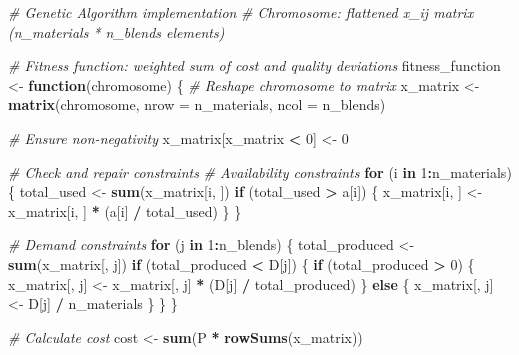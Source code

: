 \documentclass[
]{article}
\newenvironment{Shaded}{\begin{snugshade}}{\end{snugshade}}
\newcommand{\AttributeTok}[1]{\textcolor[rgb]{0.13,0.29,0.53}{#1}}
\newcommand{\CommentTok}[1]{\textcolor[rgb]{0.56,0.35,0.01}{\textit{#1}}}
\newcommand{\ControlFlowTok}[1]{\textcolor[rgb]{0.13,0.29,0.53}{\textbf{#1}}}
\newcommand{\DecValTok}[1]{\textcolor[rgb]{0.00,0.00,0.81}{#1}}
\newcommand{\FunctionTok}[1]{\textcolor[rgb]{0.13,0.29,0.53}{\textbf{#1}}}
\newcommand{\NormalTok}[1]{#1}
\newcommand{\OtherTok}[1]{\textcolor[rgb]{0.56,0.35,0.01}{#1}}
\newcommand{\SpecialCharTok}[1]{\textcolor[rgb]{0.81,0.36,0.00}{\textbf{#1}}}
\begin{document}
\begin{Shaded}
\begin{Highlighting}[]
\CommentTok{\# Genetic Algorithm implementation}
\CommentTok{\# Chromosome: flattened x\_ij matrix (n\_materials * n\_blends elements)}

\CommentTok{\# Fitness function: weighted sum of cost and quality deviations}
\NormalTok{fitness\_function }\OtherTok{\textless{}{-}} \ControlFlowTok{function}\NormalTok{(chromosome) \{}
  \CommentTok{\# Reshape chromosome to matrix}
\NormalTok{  x\_matrix }\OtherTok{\textless{}{-}} \FunctionTok{matrix}\NormalTok{(chromosome, }\AttributeTok{nrow =}\NormalTok{ n\_materials, }\AttributeTok{ncol =}\NormalTok{ n\_blends)}
  
  \CommentTok{\# Ensure non{-}negativity}
\NormalTok{  x\_matrix[x\_matrix }\SpecialCharTok{\textless{}} \DecValTok{0}\NormalTok{] }\OtherTok{\textless{}{-}} \DecValTok{0}
  
  \CommentTok{\# Check and repair constraints}
  \CommentTok{\# Availability constraints}
  \ControlFlowTok{for}\NormalTok{ (i }\ControlFlowTok{in} \DecValTok{1}\SpecialCharTok{:}\NormalTok{n\_materials) \{}
\NormalTok{    total\_used }\OtherTok{\textless{}{-}} \FunctionTok{sum}\NormalTok{(x\_matrix[i, ])}
    \ControlFlowTok{if}\NormalTok{ (total\_used }\SpecialCharTok{\textgreater{}}\NormalTok{ a[i]) \{}
\NormalTok{      x\_matrix[i, ] }\OtherTok{\textless{}{-}}\NormalTok{ x\_matrix[i, ] }\SpecialCharTok{*}\NormalTok{ (a[i] }\SpecialCharTok{/}\NormalTok{ total\_used)}
\NormalTok{    \}}
\NormalTok{  \}}
  
  \CommentTok{\# Demand constraints}
  \ControlFlowTok{for}\NormalTok{ (j }\ControlFlowTok{in} \DecValTok{1}\SpecialCharTok{:}\NormalTok{n\_blends) \{}
\NormalTok{    total\_produced }\OtherTok{\textless{}{-}} \FunctionTok{sum}\NormalTok{(x\_matrix[, j])}
    \ControlFlowTok{if}\NormalTok{ (total\_produced }\SpecialCharTok{\textless{}}\NormalTok{ D[j]) \{}
      \ControlFlowTok{if}\NormalTok{ (total\_produced }\SpecialCharTok{\textgreater{}} \DecValTok{0}\NormalTok{) \{}
\NormalTok{        x\_matrix[, j] }\OtherTok{\textless{}{-}}\NormalTok{ x\_matrix[, j] }\SpecialCharTok{*}\NormalTok{ (D[j] }\SpecialCharTok{/}\NormalTok{ total\_produced)}
\NormalTok{      \} }\ControlFlowTok{else}\NormalTok{ \{}
\NormalTok{        x\_matrix[, j] }\OtherTok{\textless{}{-}}\NormalTok{ D[j] }\SpecialCharTok{/}\NormalTok{ n\_materials}
\NormalTok{      \}}
\NormalTok{    \}}
\NormalTok{  \}}
  
  \CommentTok{\# Calculate cost}
\NormalTok{  cost }\OtherTok{\textless{}{-}} \FunctionTok{sum}\NormalTok{(P }\SpecialCharTok{*} \FunctionTok{rowSums}\NormalTok{(x\_matrix))}
  

\end{Highlighting}
\end{Shaded}
\end{document}
